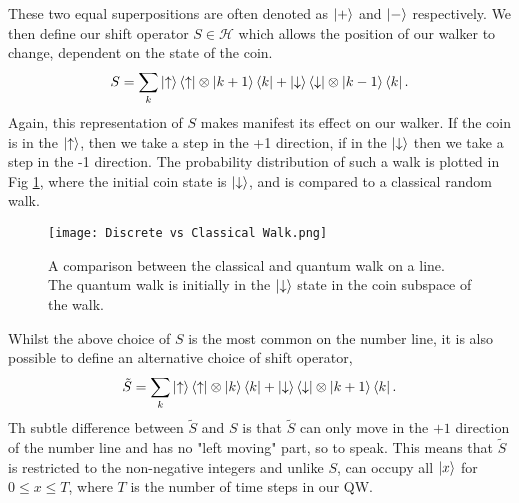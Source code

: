 These two equal superpositions are often denoted as $\ket{+}$ and $\ket{-}$ respectively.\newline
We then define our shift operator $S \in \mathcal{H}$ which allows the position of our walker to change, dependent on the state of the coin.
\begin{equation}
    S = \sum_k \ket{\uparrow}\bra{\uparrow} \otimes \ket{k + 1}\bra{k} + \ket{\downarrow}\bra{\downarrow} \otimes \ket{k - 1}\bra{k}.
\end{equation}
Again, this representation of $S$ makes manifest its effect on our walker. 
If the coin is in the $\ket{\uparrow}$, then we take a step in the +1 direction, if in the $\ket{\downarrow}$ then we take a step in the -1 direction. 
The probability distribution of such a walk is plotted in Fig \ref{fig:discVSclass}, where the initial coin state is $\ket{\downarrow}$, and is compared to a classical random walk.\newline

\begin{figure}
    \centering
    \texttt{[image: Discrete vs Classical Walk.png]}
    \caption{A comparison between the classical and quantum walk on a line. The quantum walk is initially in the $\ket{\downarrow}$ state in the coin subspace of the walk.}
    \label{fig:discVSclass}
\end{figure}

Whilst the above choice of $S$ is the most common on the number line, it is also possible to define an alternative choice of shift operator,
\begin{equation}
    \tilde{S} = \sum_k \ket{\uparrow}\bra{\uparrow} \otimes \ket{k}\bra{k} + \ket{\downarrow}\bra{\downarrow} \otimes \ket{k + 1}\bra{k}.
\end{equation}
Th subtle difference between $\tilde{S}$ and $S$ is that $\tilde{S}$ can only move in the $+1$ direction of the number line and has no "left moving" part, so to speak. 
This means that $\tilde{S}$ is restricted to the non-negative integers and unlike $S$, can occupy all $\ket{x}$ for $0\leq x\leq T$, where $T$ is the number of time steps in our QW.